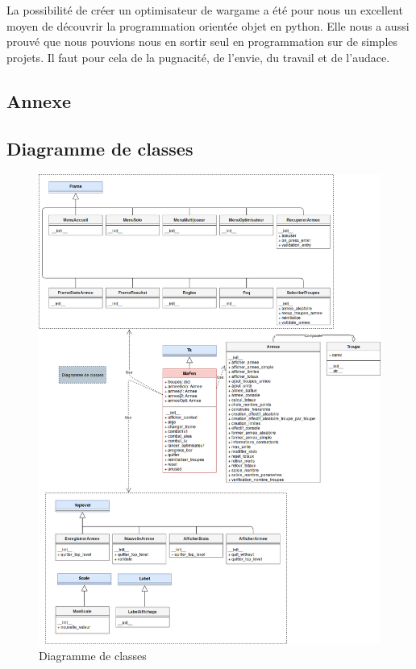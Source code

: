 \documentclass[a4paper]{article} %
\begin{document}
La possibilité de créer un optimisateur de wargame a été pour nous un excellent moyen de découvrir la programmation orientée objet en python. Elle nous a aussi prouvé que nous pouvions nous en sortir seul en programmation sur de simples projets. Il faut pour cela de la pugnacité, de l'envie, du travail et de l'audace.
\newpage
\begin{appendix}
    \section{Annexe}
    \subsection{Diagramme de classes}
    \label{Annexe A}
    \begin{figure}[!h]
	\begin{center}
	\includegraphics[width=16cm]{Images/diagramme-de-classes.png}
	\caption{Diagramme de classes\label{fig:DiagClasses}}
	\end{center}
	\end{figure}
\end{appendix}
\end{document}
